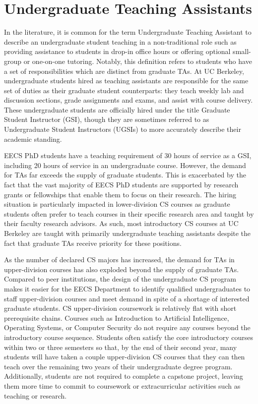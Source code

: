 \section{Undergraduate Teaching Assistants}

In the literature, it is common for the term Undergraduate Teaching Assistant to describe an undergraduate student teaching in a non-traditional role such as providing assistance to students in drop-in office hours or offering optional small-group or one-on-one tutoring. Notably, this definition refers to students who have a set of responsibilities which are distinct from graduate TAs. At UC Berkeley, undergraduate students hired as teaching assistants are responsible for the same set of duties as their graduate student counterparts: they teach weekly lab and discussion sections, grade assignments and exams, and assist with course delivery. These undergraduate students are officially hired under the title Graduate Student Instructor (GSI), though they are sometimes referred to as Undergraduate Student Instructors (UGSIs) to more accurately describe their academic standing.

EECS PhD students have a teaching requirement of 30 hours of service as a GSI, including 20 hours of service in an undergraduate course. However, the demand for TAs far exceeds the supply of graduate students. This is exacerbated by the fact that the vast majority of EECS PhD students are supported by research grants or fellowships that enable them to focus on their research. The hiring situation is particularly impacted in lower-division CS courses as graduate students often prefer to teach courses in their specific research area and taught by their faculty research advisors. As such, most introductory CS courses at UC Berkeley are taught with primarily undergraduate teaching assistants despite the fact that graduate TAs receive priority for these positions.

As the number of declared CS majors has increased, the demand for TAs in upper-division courses has also exploded beyond the supply of graduate TAs. Compared to peer institutions, the design of the undergraduate CS program makes it easier for the EECS Department to identify qualified undergraduates to staff upper-division courses and meet demand in spite of a shortage of interested graduate students. CS upper-division coursework is relatively flat with short prerequisite chains. Courses such as Introduction to Artificial Intelligence, Operating Systems, or Computer Security do not require any courses beyond the introductory course sequence. Students often satisfy the core introductory courses within two or three semesters so that, by the end of their second year, many students will have taken a couple upper-division CS courses that they can then teach over the remaining two years of their undergraduate degree program. Additionally, students are not required to complete a capstone project, leaving them more time to commit to coursework or extracurricular activities such as teaching or research.

